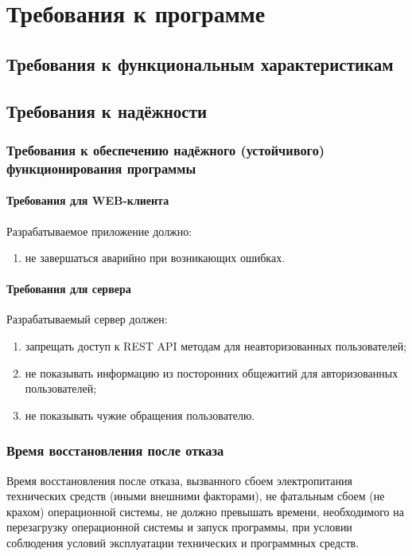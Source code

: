 \section{Требования к программе}

\subsection{Требования к функциональным характеристикам}



\subsection{Требования к надёжности}

\subsubsection{Требования к обеспечению надёжного (устойчивого) функционирования программы}
\paragraph{Требования для WEB-клиента}
Разрабатываемое приложение должно:
\begin{enumerate}
    \item не завершаться аварийно при возникающих ошибках.
\end{enumerate}

\paragraph{Требования для сервера}
Разрабатываемый сервер должен:
\begin{enumerate}
    \item запрещать доступ к REST API методам для неавторизованных пользователей;
    \item не показывать информацию из посторонних общежитий для авторизованных пользователей;
    \item не показывать чужие обращения пользователю.
\end{enumerate}

\subsubsection{Время восстановления после отказа}
Время восстановления после отказа, вызванного сбоем электропитания технических средств (иными внешними факторами),
не фатальным сбоем (не крахом) операционной системы, не должно превышать времени, необходимого на перезагрузку
операционной системы и запуск программы, при условии соблюдения условий эксплуатации технических и программных средств.

